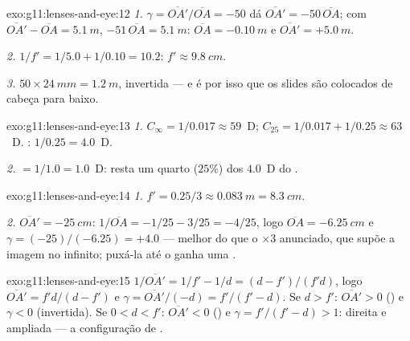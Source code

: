 \begin{solution}{exo:g11:lenses-and-eye:12}
\emph{1.} $\gamma = \overline{OA'}/\overline{OA} = -50$ dá
$\overline{OA'} = -50\,\overline{OA}$; com
$\overline{OA'} - \overline{OA} = \qty{5.1}{m}$,
$-51\,\overline{OA} = \qty{5.1}{m}$: $\overline{OA} = \qty{-0.10}{m}$ e
$\overline{OA'} = +\qty{5.0}{m}$.

\emph{2.} $1/f' = 1/5.0 + 1/0.10 = 10.2$: $f' \approx \qty{9.8}{cm}$.

\emph{3.} $50 \times \qty{24}{mm} = \qty{1.2}{m}$, invertida --- e é por
isso que os slides são colocados de cabeça para baixo.
\end{solution}

\begin{solution}{exo:g11:lenses-and-eye:13}
\emph{1.} $C_\infty = 1/0.017 \approx 59$~D;
$C_{25} = 1/0.017 + 1/0.25 \approx 63$~D. :
$1/0.25 = 4.0$~D.

\emph{2.}  $= 1/1.0 = 1.0$~D: resta um quarto ($25\%$) dos
$4.0$~D do .
\end{solution}

\begin{solution}{exo:g11:lenses-and-eye:14}
\emph{1.} $f' = 0.25/3 \approx \qty{0.083}{m} = \qty{8.3}{cm}$.

\emph{2.} $\overline{OA'} = \qty{-25}{cm}$:
$1/\overline{OA} = -1/25 - 3/25 = -4/25$, logo
$\overline{OA} = \qty{-6.25}{cm}$ e $\gamma = (-25)/(-6.25) = +4.0$ ---
melhor do que o $\times 3$ anunciado, que supõe a imagem no infinito;
puxá-la até o  ganha uma .
\end{solution}

\begin{solution}{exo:g11:lenses-and-eye:15}
$1/\overline{OA'} = 1/f' - 1/d = (d - f')/(f'd)$, logo
$\overline{OA'} = f'd/(d - f')$ e
$\gamma = \overline{OA'}/(-d) = f'/(f' - d)$. Se $d > f'$:
$\overline{OA'} > 0$ () e $\gamma < 0$ (invertida). Se
$0 < d < f'$: $\overline{OA'} < 0$ () e
$\gamma = f'/(f' - d) > 1$: direita e ampliada --- a configuração de
.
\end{solution}

